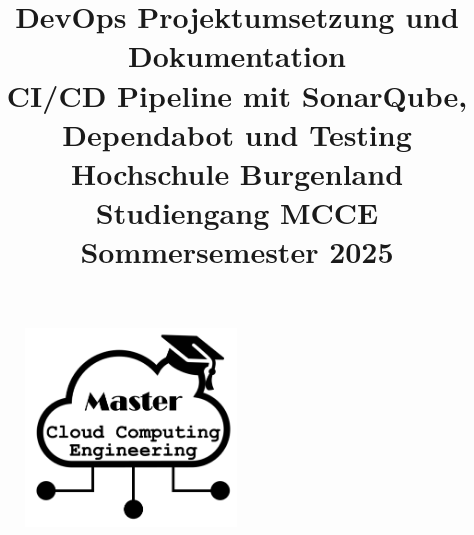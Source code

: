 \begin{figure}
    \centering
    \includegraphics[width=0.5\textwidth]{fig/Fig1.png}
    \label{fig:title-image}
\end{figure}


\title{
    DevOps Projektumsetzung und Dokumentation \\
    \large{CI/CD Pipeline mit SonarQube, Dependabot und Testing} \\
    \vspace{0.5cm}
    \large{Hochschule Burgenland} \\
    \large{Studiengang MCCE} \\
    \large{Sommersemester 2025}
}

